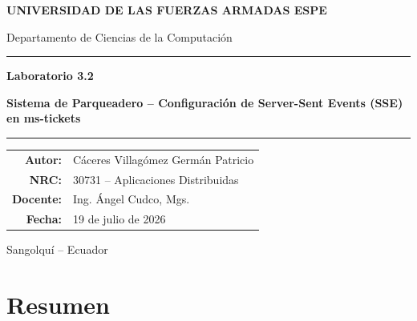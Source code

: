 \documentclass[12pt,letterpaper]{article}
\begin{document}
\begin{titlepage}
  \centering
  \vspace*{1cm}

  {\large\bfseries UNIVERSIDAD DE LAS FUERZAS ARMADAS ESPE\par}
  \vspace{0.3cm}
  {\normalsize Departamento de Ciencias de la Computación\par}

  \vspace{2.5cm}

  \rule{\linewidth}{0.4pt}
  \vspace{0.4cm}
  {\Large\bfseries Laboratorio 3.2\par}
  \vspace{0.2cm}
  {\Large\bfseries Sistema de Parqueadero -- Configuración de Server-Sent Events (SSE) en ms-tickets\par}
  \vspace{0.4cm}
  \rule{\linewidth}{0.4pt}

  \vspace{2.5cm}

  \begin{tabular}{rl}
    \textbf{Autor:} & Cáceres Villagómez Germán Patricio \\[0.3em]
    \textbf{NRC:} & 30731 -- Aplicaciones Distribuidas \\[0.3em]
    \textbf{Docente:} & Ing. Ángel Cudco, Mgs. \\[0.3em]
    \textbf{Fecha:} & 19 de julio de 2026 \\
  \end{tabular}

  \vfill

  {\small Sangolquí -- Ecuador\par}
  \vspace{0.3cm}
\end{titlepage}

\tableofcontents
\newpage

\section*{Resumen}
\end{document}
